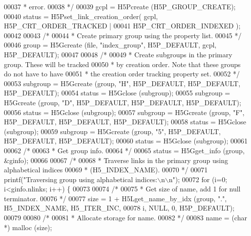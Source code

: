 \begin{DoxyCode}
00037 \textcolor{comment}{     * error.}
00038 \textcolor{comment}{     */}
00039     gcpl = H5Pcreate (H5P\_GROUP\_CREATE);
00040     status = H5Pset\_link\_creation\_order( gcpl, H5P\_CRT\_ORDER\_TRACKED |
00041                 H5P\_CRT\_ORDER\_INDEXED );
00042 
00043     \textcolor{comment}{/*}
00044 \textcolor{comment}{     * Create primary group using the property list.}
00045 \textcolor{comment}{     */}
00046     group = H5Gcreate (file, \textcolor{stringliteral}{"index\_group"}, H5P\_DEFAULT, gcpl, H5P\_DEFAULT);
00047 
00048     \textcolor{comment}{/*}
00049 \textcolor{comment}{     * Create subgroups in the primary group.  These will be tracked}
00050 \textcolor{comment}{     * by creation order.  Note that these groups do not have to have}
00051 \textcolor{comment}{     * the creation order tracking property set.}
00052 \textcolor{comment}{     */}
00053     subgroup = H5Gcreate (group, \textcolor{stringliteral}{"H"}, H5P\_DEFAULT, H5P\_DEFAULT, H5P\_DEFAULT);
00054     status = H5Gclose (subgroup);
00055     subgroup = H5Gcreate (group, \textcolor{stringliteral}{"D"}, H5P\_DEFAULT, H5P\_DEFAULT, H5P\_DEFAULT);
00056     status = H5Gclose (subgroup);
00057     subgroup = H5Gcreate (group, \textcolor{stringliteral}{"F"}, H5P\_DEFAULT, H5P\_DEFAULT, H5P\_DEFAULT);
00058     status = H5Gclose (subgroup);
00059     subgroup = H5Gcreate (group, \textcolor{stringliteral}{"5"}, H5P\_DEFAULT, H5P\_DEFAULT, H5P\_DEFAULT);
00060     status = H5Gclose (subgroup);
00061 
00062     \textcolor{comment}{/*}
00063 \textcolor{comment}{     * Get group info.}
00064 \textcolor{comment}{     */}
00065     status = H5Gget\_info (group, &ginfo);
00066 
00067     \textcolor{comment}{/*}
00068 \textcolor{comment}{     * Traverse links in the primary group using alphabetical indices}
00069 \textcolor{comment}{     * (H5\_INDEX\_NAME).}
00070 \textcolor{comment}{     */}
00071     printf(\textcolor{stringliteral}{"Traversing group using alphabetical indices:\(\backslash\)n\(\backslash\)n"});
00072     \textcolor{keywordflow}{for} (i=0; i<ginfo.nlinks; i++) \{
00073 
00074         \textcolor{comment}{/*}
00075 \textcolor{comment}{         * Get size of name, add 1 for null terminator.}
00076 \textcolor{comment}{         */}
00077         size = 1 + H5Lget\_name\_by\_idx (group, \textcolor{stringliteral}{"."}, H5\_INDEX\_NAME, H5\_ITER\_INC,
00078                     i, NULL, 0, H5P\_DEFAULT);
00079 
00080         \textcolor{comment}{/*}
00081 \textcolor{comment}{         * Allocate storage for name.}
00082 \textcolor{comment}{         */}
00083         name = (\textcolor{keywordtype}{char} *) malloc (size);

\end{DoxyCode}
